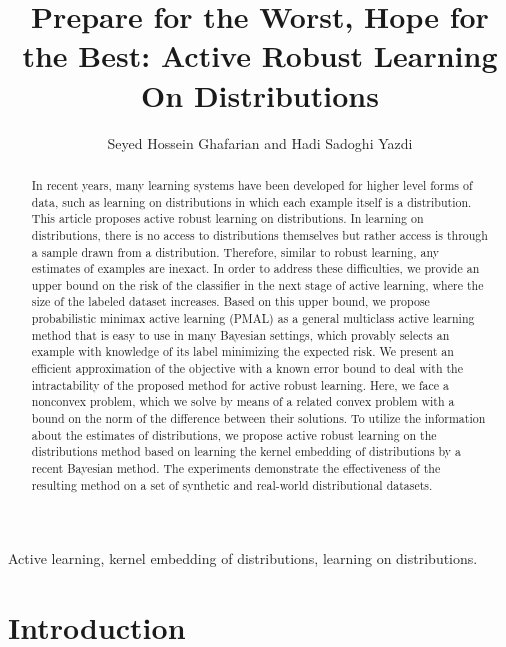 \documentclass[10pt,twocolumn]{IEEEtran}
\begin{document}
	
	\title{Prepare for the Worst, Hope for the Best: Active Robust Learning On Distributions}
	\author{Seyed Hossein Ghafarian and Hadi Sadoghi Yazdi}
	
	\maketitle
	
	\begin{abstract}
		In recent years, many learning systems have been developed for higher level forms of data, such as learning on distributions in which each example itself is a distribution. This article proposes active robust learning on distributions. In learning on distributions, there is no access to distributions themselves but rather access is through a sample drawn from a distribution. Therefore, similar to robust learning, any estimates of examples are inexact. In order to address these difficulties, we provide an upper bound on the risk of the classifier in the next stage of active learning, where the size of the labeled dataset increases. Based on this upper bound, we propose probabilistic minimax active learning (PMAL) as a general multiclass active learning method that is easy to use in many Bayesian settings, which provably selects an example with knowledge of its label minimizing the expected risk. We present an efficient approximation of the objective with a known error bound to deal with the intractability of the proposed method for active robust learning. Here, we face a nonconvex problem, which we solve by means of a related convex problem with a bound on the norm of the difference between their solutions. To utilize the information about the estimates of distributions, we propose active robust learning on the distributions method based on learning the kernel embedding of distributions by a recent Bayesian method. The experiments demonstrate the effectiveness of the resulting method on a set of synthetic and real-world distributional datasets.
	\end{abstract}
	
	\begin{IEEEkeywords}
		Active learning, kernel embedding of distributions, learning on distributions.
	\end{IEEEkeywords}
	
	\section{Introduction}
	
\end{document}
